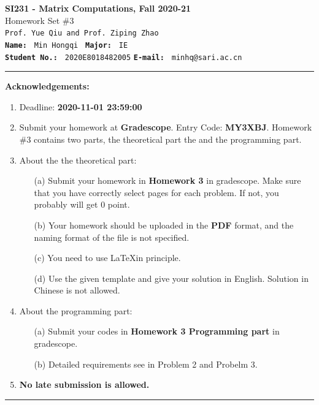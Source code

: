 \documentclass[english,onecolumn]{IEEEtran}
\begin{document}
\begin{center}
	\textbf{\LARGE{SI231 - Matrix Computations, Fall 2020-21}}\\
	{\Large Homework Set \#3}\\
	\texttt{Prof. Yue Qiu and Prof. Ziping Zhao}\\
	\texttt{\textbf{Name:}}   	\texttt{ Min Hongqi }  		\hspace{1bp}
	\texttt{\textbf{Major:}}  	\texttt{ IE } 	\\
	\texttt{\textbf{Student No.:}} 	\texttt{ 2020E8018482005}     \hspace{1bp}
	\texttt{\textbf{E-mail:}} 	\texttt{ minhq@sari.ac.cn}
\par\end{center}



\noindent
\rule{\linewidth}{0.4pt}
{\bf {\large Acknowledgements:}}
\begin{enumerate}
    \item Deadline: \textbf{2020-11-01 23:59:00}
    \item Submit your homework at \textbf{Gradescope}. Entry Code: \textbf{MY3XBJ}. 
    Homework \#3 contains two parts, the theoretical part the and the programming part.
    \item About the the theoretical part:
    \begin{enumerate}
            \item[(a)] Submit your homework in \textbf{Homework 3} in gradescope. Make sure that you have correctly select pages for each problem. If not, you probably will get 0 point.
            \item[(b)] Your homework should be uploaded in the \textbf{PDF} format, and the naming format of the file is not specified.
            \item[(c)] You need to use \LaTeX in principle.
            \item[(d)] Use the given template and give your solution in English. Solution in Chinese is not allowed. 
        \end{enumerate}
  \item About the programming part:
  \begin{enumerate}
      \item[(a)] Submit your codes in \textbf{Homework 3 Programming part} in gradescope.
      \item[(b)] Detailed requirements see in Problem 2 and Probelm 3.
  \end{enumerate}
  \item \textbf{No late submission is allowed.}
\end{enumerate}
\rule{\linewidth}{0.4pt}
\newpage 
\end{document}
